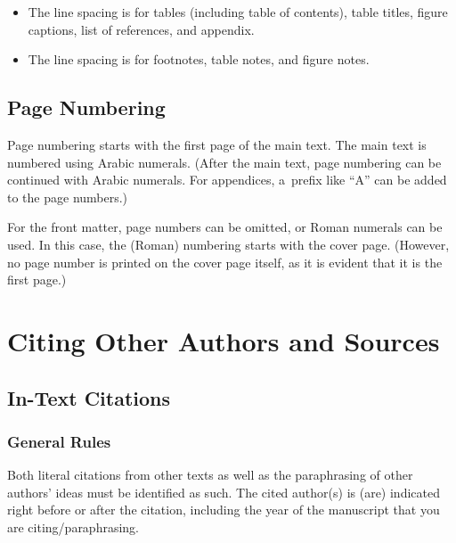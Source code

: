 \documentclass[11pt, a4paper, oneside]{article}
\newlength{\baselinedist}
\newlength{\smalllinespacing}
\newlength{\footnotelinespacing}
\theoremstyle{Plain}
\theoremstyle{Definition}
\theoremstyle{Remark}
\begin{document}
\begin{itemize}
\begin{itemize}
			\item Level-4 headings (\verb|\paragraph|) are spaced \makeatletter\SI[round-mode = places, round-precision = 2]{\strip@pt\baselinedistHalf}{pt}\makeatother\ above and 0~pt below. (A~fourth sectioning level is usually too much for a~thesis.)
		\end{itemize}
	\item The line spacing is \printlength{\smalllinespacing} for tables (including table of contents), table titles, figure captions, list of references, and appendix.
	\item The line spacing is \printlength{\footnotelinespacing} for footnotes, table notes, and figure notes.
\end{itemize}

\subsection{Page Numbering}

Page numbering starts with the first page of the main text. The main text is numbered using Arabic numerals. (After the main text, page numbering can be continued with Arabic numerals. For appendices, a~prefix like ``A'' can be added to the page numbers.)

For the front matter, page numbers can be omitted, or Roman numerals can be used. In this case, the (Roman) numbering starts with the cover page. (However, no page number is printed on the cover page itself, as it is evident that it is the first page.)


\section{Citing Other Authors and Sources}
\label{sec:citations}

\subsection{In-Text Citations}

\subsubsection{General Rules}

Both literal citations from other texts as well as the paraphrasing of other authors' ideas must be identified as such. The cited author(s) is (are) indicated right before or after the citation, including the year of the manuscript that you are citing/paraphrasing.
\end{document}
